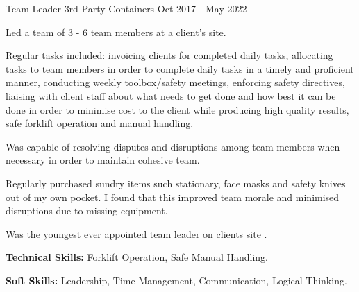 \begin{cventries}
  \cventry
    {Team Leader}           %
    {3rd Party Containers}  %
    {}  %
    {Oct 2017 - May 2022}   %
    {
      \begin{cvitems} %
        \item {Led a team of 3 - 6 team members at a client's site.}
        \item {Regular tasks included: invoicing clients for completed daily tasks, allocating tasks to team members in order to complete daily tasks in a timely and proficient manner, conducting weekly toolbox/safety meetings, enforcing safety directives, liaising with client staff about what needs to get done and how best it can be done in order to minimise cost to the client while producing high quality results, safe forklift operation and manual handling.}
        \item {Was capable of resolving disputes and disruptions among team members when necessary in order to maintain cohesive team.}
        \item {Regularly purchased sundry items such stationary, face masks and safety knives out of my own pocket. I found that this improved team morale and minimised disruptions due to missing equipment.}
        \item {Was the youngest ever appointed team leader on clients site .}
        \item {\textbf{Technical Skills:} Forklift Operation, Safe Manual Handling.}
        \item {\textbf{Soft Skills:} Leadership, Time Management, Communication, Logical Thinking.}
      \end{cvitems}
    }

\end{cventries}
